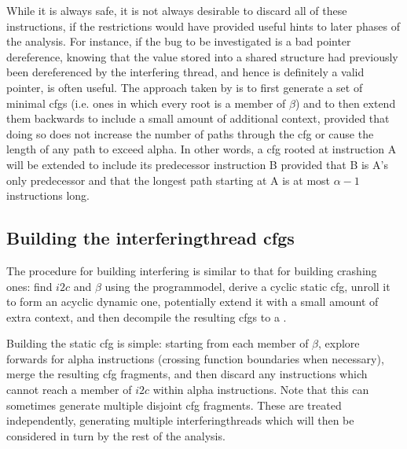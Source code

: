 While it is always safe, it is not always desirable to discard all of
these instructions, if the restrictions would have provided useful
hints to later phases of the analysis.  For instance, if the bug to be
investigated is a bad pointer dereference, knowing that the value
stored into a shared structure had previously been dereferenced by the
interfering thread, and hence is definitely a valid pointer, is often
useful.  The approach taken by {\implementation} is to first generate
a set of minimal \glspl{cfg} (i.e. ones in which every root is a
member of $\beta$) and to then extend them backwards to include a
small amount of additional context, provided that doing so does not
increase the number of paths through the \gls{cfg} or cause the length
of any path to exceed \gls{alpha}.  In other words, a \gls{cfg} rooted
at instruction A will be extended to include its predecessor
instruction B provided that B is A's only predecessor and that the
longest path starting at A is at most $\alpha - 1$ instructions long.

\subsection[Building the \glsentrytext{interferingthread} \glsentrytext{cfg}s]{Building the \gls{interferingthread} \glspl{cfg}}

The procedure for building interfering {\StateMachines} is similar to
that for building crashing ones: find $i2c$ and $\beta$ using the
\gls{programmodel}, derive a cyclic static \gls{cfg}, unroll it to
form an acyclic dynamic one, potentially extend it with a small amount
of extra context, and then decompile the resulting \glspl{cfg} to a
{\StateMachine}.  

Building the static \gls{cfg} is simple: starting from each member of
$\beta$, explore forwards for \gls{alpha} instructions (crossing
function boundaries when necessary), merge the resulting \gls{cfg}
fragments, and then discard any instructions which cannot reach a
member of $i2c$ within \gls{alpha} instructions.  Note that this can
sometimes generate multiple disjoint \gls{cfg} fragments.  These are
treated independently, generating multiple \glspl{interferingthread}
which will then be considered in turn by the rest of the analysis.

